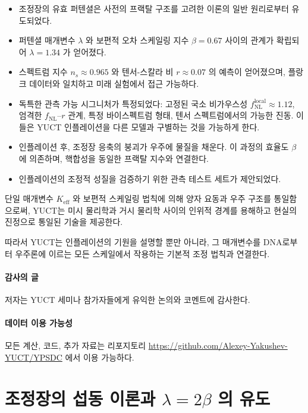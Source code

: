 \documentclass[11pt,a4paper]{article}
\theoremstyle{remark}
\begin{document}
	\begin{itemize}
		\item 조정장의 유효 퍼텐셜은 사전의 프랙탈 구조를 고려한 이론의 일반 원리로부터 유도되었다.
		\item 퍼텐셜 매개변수 $\lambda$ 와 보편적 오차 스케일링 지수 $\beta = 0.67$ 사이의 관계가 확립되어 $\lambda = 1.34$ 가 얻어졌다.
		\item 스펙트럼 지수 $n_s \approx 0.965$ 와 텐서-스칼라 비 $r \approx 0.07$ 의 예측이 얻어졌으며, 플랑크 데이터와 일치하고 미래 실험에서 접근 가능하다.
		\item 독특한 관측 가능 시그니처가 특정되었다: 고정된 국소 비가우스성 $f_{\text{NL}}^{\text{local}} \approx 1.12$, 엄격한 $f_{\text{NL}}$–$r$ 관계, 특정 바이스펙트럼 형태, 텐서 스펙트럼에서의 가능한 진동. 이들은 YUCT 인플레이션을 다른 모델과 구별하는 것을 가능하게 한다.
		\item 인플레이션 후, 조정장 응축의 붕괴가 우주에 물질을 채운다. 이 과정의 효율도 $\beta$ 에 의존하며, 핵합성을 동일한 프랙탈 지수와 연결한다.
		\item 인플레이션의 조정적 성질을 검증하기 위한 관측 테스트 세트가 제안되었다.
	\end{itemize}
	
	단일 매개변수 $K_{\mathrm{eff}}$ 와 보편적 스케일링 법칙에 의해 양자 요동과 우주 구조를 통일함으로써, YUCT는 미시 물리학과 거시 물리학 사이의 인위적 경계를 용해하고 현실의 진정으로 통일된 기술을 제공한다.
	
	따라서 YUCT는 인플레이션의 기원을 설명할 뿐만 아니라, 그 매개변수를 DNA로부터 우주론에 이르는 모든 스케일에서 작용하는 기본적 조정 법칙과 연결한다.
	
	\paragraph*{감사의 글}
	저자는 YUCT 세미나 참가자들에게 유익한 논의와 코멘트에 감사한다.
	
	\paragraph*{데이터 이용 가능성}
	모든 계산, 코드, 추가 자료는 리포지토리 \url{https://github.com/Alexey-Yakushev-YUCT/YPSDC} 에서 이용 가능하다.
	
	\appendix
	\section{조정장의 섭동 이론과 $\lambda = 2\beta$ 의 유도}
	\label{app:perturbations}
	
\end{document}
